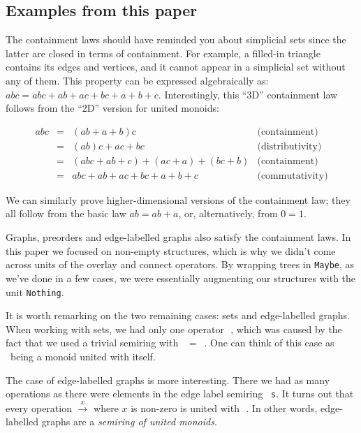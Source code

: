 \documentclass[english,submission]{programming}
\newcommand{\hcode}[1]{{\color{darkblue} \lstinline[keywordstyle={}]|#1|}} %
\newcommand{\hdia}{\,\text{\raisebox{-0.2mm}{\Large\color{darkblue} $\diamond$}}\,}
\newcommand{\zero}{\raisebox{-0.2mm}{\textcircled{0}}\xspace}
\newcommand{\one}{\raisebox{-0.2mm}{\textcircled{1}}\xspace}
\begin{document}

\subsection{Examples from this paper}

The containment laws should have reminded you about simplicial sets since
the latter are closed in terms of containment. For example, a filled-in triangle
contains its edges and vertices, and it cannot appear in a simplicial set
without any of them. This property can be expressed algebraically as:
$abc = abc + ab + ac + bc + a + b + c$. Interestingly, this ``3D'' containment
law follows from the ``2D'' version for united monoids:

\vspace{-5mm}
\begin{equation*}
\begin{array}{rcll}
abc & = & (ab + a + b)c & \text{(containment)}\\
 & = & (ab)c + ac + bc & \text{(distributivity)}\\
 & = & (abc + ab + c) + (ac + a) + (bc + b) & \text{(containment)}\\
 & = & abc + ab + ac + bc + a + b + c & \text{(commutativity)}
\end{array}
\end{equation*}
\vspace{-3mm}

\noindent
We can similarly prove higher-dimensional versions of the containment law; they
all follow from the basic law $ab = ab + a$, or, alternatively, from $0 = 1$.

Graphs, preorders and edge-labelled graphs also satisfy the containment laws.
In this paper we focused on non-empty structures, which is why we didn't come
across units of the overlay and connect operators. By wrapping trees in
\hcode{Maybe}, as we've done in a few cases, we were essentially augmenting our
structures with the unit \hcode{Nothing}.

It is worth remarking on the two remaining cases: sets and edge-labelled graphs.
When working with sets, we had only one operator \hdia, which was caused by the
fact that we used a trivial semiring with \zero~$=$~\one. One can think of this
case as \hdia~being a monoid united with itself.

The case of edge-labelled graphs is more interesting. There we had as many
operations as there were elements in the edge label semiring~\hcode{s}. It turns
out that every operation $\xrightarrow{x}$ where $x$ is non-zero is united with
\hdia. In other words, edge-labelled graphs are a
\emph{semiring of united monoids}.
\end{document}
